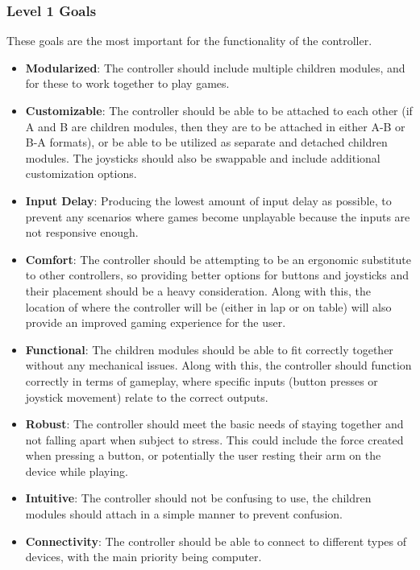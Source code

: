 \documentclass[a4]{article}
\begin{document}
\subsubsection{Level 1 Goals}
These goals are the most important for the functionality of the controller.
\begin{itemize}
    \item \textcolor{McMasterMaroon}{\textbf{Modularized}}: The controller should include multiple children modules, and for these to work together to play games.
    \item \textcolor{McMasterMaroon}{\textbf{Customizable}}: The controller should be able to be attached to each other (if A and B are children modules, then they are to be attached in either A-B or B-A formats), or be able to be utilized as separate and detached children modules.
        The joysticks should also be swappable and include additional customization options.
    \item \textcolor{McMasterMaroon}{\textbf{Input Delay}}: Producing the lowest amount of input delay as possible, to prevent any scenarios where games become unplayable because the inputs are not responsive enough.
    \item \textcolor{McMasterMaroon}{\textbf{Comfort}}: The controller should be attempting to be an ergonomic substitute to other controllers, so providing better options for buttons and joysticks and their placement should be a heavy consideration. 
        Along with this, the location of where the controller will be (either in lap or on table) will also provide an improved gaming experience for the user.
    \item \textcolor{McMasterMaroon}{\textbf{Functional}}: The children modules should be able to fit correctly together without any mechanical issues. Along with this, the controller should function correctly in terms of gameplay, where specific inputs (button presses or joystick movement) relate to the correct outputs.
    \item \textcolor{McMasterMaroon}{\textbf{Robust}}: The controller should meet the basic needs of staying together and not falling apart when subject to stress. This could include the force created when pressing a button, or potentially the user resting their arm on the device while playing.
    \item \textcolor{McMasterMaroon}{\textbf{Intuitive}}: The controller should not be confusing to use, the children modules should attach in a simple manner to prevent confusion.
    \item \textcolor{McMasterMaroon}{\textbf{Connectivity}}: The controller should be able to connect to different types of devices, with the main priority being computer.   
\end{itemize}
\end{document}
